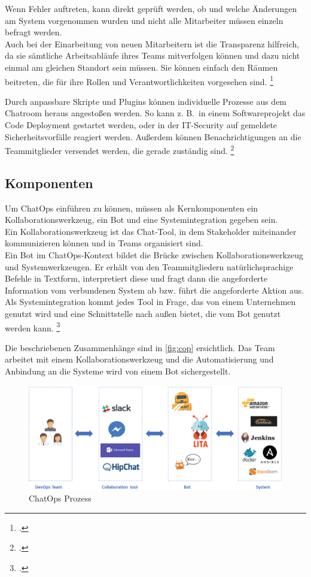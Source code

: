 Wenn Fehler auftreten, kann direkt geprüft werden, ob und welche Änderungen am System vorgenommen wurden und nicht alle Mitarbeiter müssen einzeln befragt werden.\\
Auch bei der Einarbeitung von neuen Mitarbeitern ist die Transparenz hilfreich, da sie sämtliche Arbeitsabläufe ihres Teams mitverfolgen können und dazu nicht einmal am gleichen Standort sein müssen. Sie können einfach den Räumen beitreten, die für ihre Rollen und Verantwortlichkeiten vorgesehen sind.
\footcites[Vgl.][o. \pno]{Sigler_2014_Chatops}[Vgl.][66]{Hand_2016_ChatOps}

Durch anpassbare Skripte und Plugins können individuelle Prozesse aus dem Chatroom heraus angestoßen werden. So kann z. B.~in einem Softwareprojekt das Code Deployment gestartet werden, oder in der IT-Security auf gemeldete Sicherheitsvorfälle reagiert werden. Außerdem können Benachrichtigungen an die Teammitglieder versendet werden, die gerade zuständig sind.
\footcite[Vgl.][o. \pno]{Sigler_2014_Chatops}

\subsection{Komponenten}
Um ChatOps einführen zu können, müssen als Kernkomponenten ein Kollaborationswerkzeug, ein Bot und eine Systemintegration gegeben sein.\\
Ein Kollaborationswerkzeug ist das Chat-Tool, in dem Stakeholder miteinander kommunizieren können und in Teams organisiert sind.\\
Ein Bot im ChatOps-Kontext bildet die Brücke zwischen Kollaborationswerkzeug und Systemwerkzeugen. Er erhält von den Teammitgliedern natürlichsprachige Befehle in Textform, interpretiert diese und fragt dann die angeforderte Information vom verbundenen System ab bzw. führt die angeforderte Aktion aus.\\
Als Systemintegration kommt jedes Tool in Frage, das von einem Unternehmen genutzt wird und eine Schnittstelle nach außen bietet, die vom Bot genutzt werden kann.
\footcite[Vgl.][o. \pno]{Zyane_2017_ChatOps}


Die beschriebenen Zusammenhänge sind in \autoref{fig:cop} ersichtlich. Das Team arbeitet mit einem Kollaborationswerkzeug und die Automatisierung und Anbindung an die Systeme wird von einem Bot sichergestellt.

\begin{figure}[H]
  \centering
  \includegraphics[width=\textwidth]{Anhang/cop}
  \caption{ChatOps Prozess}
\label{fig:cop}
\end{figure}


